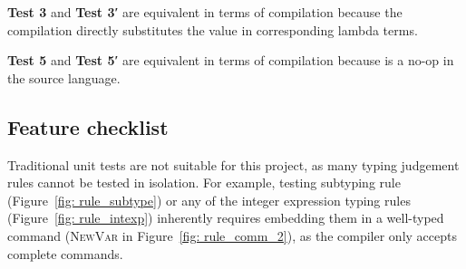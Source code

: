 \documentclass[12pt,a4paper]{report}
\theoremstyle{definition}
\begin{document}
    \textbf{Test 3} and \textbf{Test 3′} are equivalent in terms of compilation because the compilation directly substitutes the value in corresponding lambda terms. 
    
    \textbf{Test 5} and \textbf{Test 5′} are equivalent in terms of compilation because  is a no-op in the source language.

    \subsection{Feature checklist}
    Traditional unit tests are not suitable for this project, as many typing judgement rules cannot be tested in isolation. For example, testing subtyping rule (Figure~\ref{fig: rule_subtype}) or any of the integer expression typing rules (Figure~\ref{fig: rule_intexp}) inherently requires embedding them in a well-typed command (\textsc{NewVar} in Figure~\ref{fig: rule_comm_2}), as the compiler only accepts complete commands. 
\end{document}

